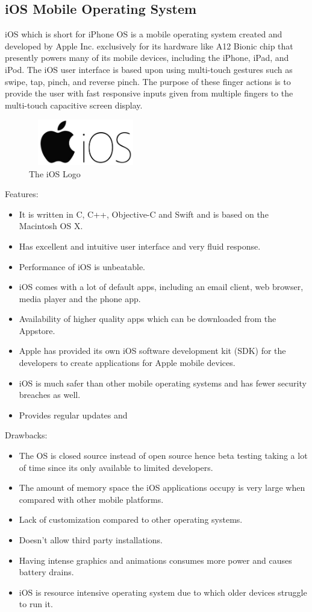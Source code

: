 \documentclass[11pt,a4paper,twoside]{article}
\begin{document}
\subsection{iOS Mobile Operating System}
iOS which is short for iPhone OS is a mobile operating system created and developed by Apple Inc. exclusively for its hardware like A12 Bionic chip that presently powers many of its mobile devices, including the iPhone, iPad, and iPod. The iOS user interface is based upon using multi-touch gestures such as swipe, tap, pinch, and reverse pinch. The purpose of these finger actions is to provide the user with fast responsive inputs given from multiple fingers to the multi-touch capacitive screen display.
\begin{figure}
\includegraphics[width=5cm,height=2cm]{Fig 9.jpg}
\caption{The iOS Logo}
\end{figure}
Features:
\begin{itemize}
\item It is written in C, C++, Objective-C and Swift and is based on the Macintosh OS X.
\item Has excellent and intuitive user interface and very fluid response.
\item Performance of iOS is unbeatable.
\item iOS comes with a lot of default apps, including an email client, web browser, media player and the phone app.
\item Availability of higher quality apps which can be downloaded from the Appstore.
\item Apple has provided its own iOS software development kit (SDK) for the developers to create applications for Apple mobile devices.
\item iOS is much safer than other mobile operating systems and has fewer security breaches as well.
\item Provides regular updates and 
\end{itemize}
Drawbacks:
\begin{itemize}
    \item The OS is closed source instead of open source hence beta testing taking a lot of time since its only available to limited developers.
\item The amount of memory space the iOS applications occupy is very large when compared with other mobile platforms.
\item Lack of customization compared to other operating systems.
\item Doesn’t allow third party installations.
\item Having intense graphics and animations consumes more power and causes battery drains.
\item iOS is resource intensive operating system due to which older devices struggle to run it.
\end{itemize}
\end{document}
